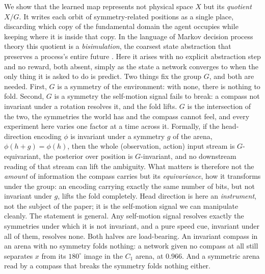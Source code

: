 \documentclass[9pt,lineno]{elife}
\begin{document}
We show that the learned map represents not physical space $X$ but its \emph{quotient} $X/G$. It
writes each orbit of symmetry-related positions as a single place, discarding which copy of the
fundamental domain the agent occupies while keeping where it is inside that copy. In the language of
Markov decision process theory this quotient is a \emph{bisimulation}, the coarsest state abstraction
that preserves a process's entire future \citep{givan2003, li2006}. Here it arises with no explicit
abstraction step and no reward, both absent, simply as the state a network converges to when the only
thing it is asked to do is predict. Two things fix the group $G$, and both are needed. First, $G$ is a
symmetry of the environment: with none, there is nothing to fold. Second, $G$ is a symmetry the
self-motion signal fails to break: a compass not invariant under a rotation resolves it, and the fold
lifts. $G$ is the intersection of the two, the symmetries the world has and the compass cannot feel,
and every experiment here varies one factor at a time across it. Formally, if the head-direction
encoding $\phi$ is invariant under a symmetry $g$ of the arena, $\phi(h+g)=\phi(h)$, then the whole
(observation, action) input stream is $G$-equivariant, the posterior over position is $G$-invariant,
and no downstream reading of that stream can lift the ambiguity. What matters is therefore not the
\emph{amount} of information the compass carries but its \emph{equivariance}, how it transforms under
the group: an encoding carrying exactly the same number of bits, but not invariant under $g$, lifts
the fold completely. Head direction is here an \emph{instrument}, not the subject of the paper; it is
the self-motion signal we can manipulate cleanly. The statement is general. Any self-motion signal
resolves exactly the symmetries under which it is not invariant, and a pure speed cue, invariant under
all of them, resolves none. Both halves are load-bearing. An invariant compass in an arena with no
symmetry folds nothing: a network given no compass at all still separates $x$ from its $180^\circ$
image in the $C_1$ arena, at $0.966$. And a symmetric arena read by a compass that breaks the symmetry
folds nothing either.
\end{document}
